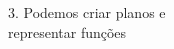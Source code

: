 \documentclass[preview]{standalone}
\begin{document}
\begin{center}
3. Podemos criar planos e \\ representar funções
\end{center}
\end{document}
